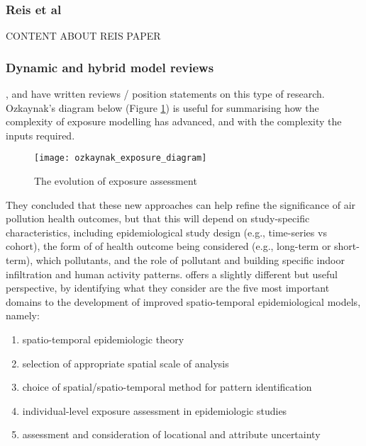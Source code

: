 \subsubsection{Reis et al}
\label{sec:dynamic_models_reis}

CONTENT ABOUT REIS PAPER

\subsubsection{Dynamic and hybrid model reviews}
\label{sec:dynamic_models_reviews}

\cite{Ozkaynak2013}, \cite{Meliker2011} and \cite{Baxter2013} have written reviews / position statements on this type of research. Ozkaynak's diagram below (Figure \ref{fig:ozkaynak_exposure_diagram}) is useful for summarising how the complexity of exposure modelling has advanced, and with the complexity the inputs required.

\begin{figure}[H]
\centering
\texttt{[image: ozkaynak\_exposure\_diagram]}
\caption{The evolution of exposure assessment}
\label{fig:ozkaynak_exposure_diagram}
\end{figure}

They concluded that these new approaches can help refine the significance of air pollution health outcomes, but that this will depend on study-specific characteristics, including epidemiological study design (e.g., time-series vs cohort), the form of of health outcome being considered (e.g., long-term or short-term), which pollutants, and the role of pollutant and building specific indoor infiltration and human activity patterns. \cite{Meliker2011} offers a slightly different but useful perspective, by identifying what they consider are the five most important domains to the development of improved spatio-temporal epidemiological models, namely:

\begin{enumerate}
  \item spatio-temporal epidemiologic theory
  \item selection of appropriate spatial scale of analysis
  \item choice of spatial/spatio-temporal method for pattern identification
  \item individual-level exposure assessment in epidemiologic studies
  \item assessment and consideration of locational and attribute uncertainty
\end{enumerate}


